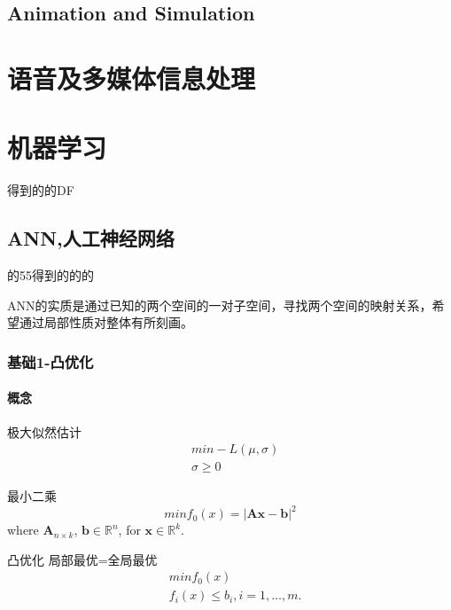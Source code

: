 \documentclass[UTF8]{../computerUniverse}
\begin{document}
\section{Animation and Simulation}











\chapter{语音及多媒体信息处理}
 




\chapter{机器学习}

得到的的DF  

\section{ANN,人工神经网络}

的55得到的的的

ANN的实质是通过已知的两个空间的一对子空间，寻找两个空间的映射关系，希望通过局部性质对整体有所刻画。


\subsection{基础1-凸优化}
\subsubsection{概念}

极大似然估计
\begin{equation}
\begin{split}
&min -L \left( \mu ,\sigma \right)\\
&\sigma \geqslant 0
\end{split}
\end{equation}

最小二乘
\begin{equation}
min f_0(x)=\left| \mathbf {Ax-b} \right|^2
\end{equation}
where $\mathbf A_{n \times k}$, $\mathbf b\in \mathbb R^n$, for $\mathbf x\in \mathbb R^k$.

凸优化 局部最优=全局最优
\begin{equation}
    \begin{split}
    &minf_0(x) \\
    &f_i(x) \leqslant b_i,i=1,\dots,m.
    \end{split}
\end{equation} 
\end{document}
